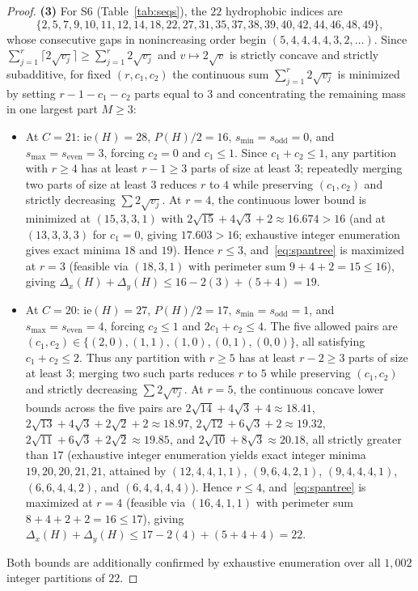 \documentclass[11pt]{article}
\begin{document}
\begin{proof}
\textbf{(3)} For S6 (Table~\ref{tab:seqs}), the $22$ hydrophobic indices are
\[
  \{2, 5, 7, 9, 10, 11, 12, 14, 18, 22, 27, 31, 35, 37, 38, 39, 40, 42, 44, 46, 48, 49\},
\]
whose consecutive gaps in nonincreasing order begin $(5, 4, 4, 4, 4, 3, 2, \dots)$. Since $\sum_{j=1}^r \lceil 2\sqrt{v_j}\rceil \ge \sum_{j=1}^r 2\sqrt{v_j}$ and $v \mapsto 2\sqrt{v}$ is strictly concave and strictly subadditive, for fixed $(r, c_1, c_2)$ the continuous sum $\sum_{j=1}^r 2\sqrt{v_j}$ is minimized by setting $r - 1 - c_1 - c_2$ parts equal to $3$ and concentrating the remaining mass in one largest part $M \ge 3$:
\begin{itemize}[leftmargin=*,topsep=1pt,itemsep=1pt]
\item At $C = 21$: $\mathrm{ie}(H) = 28$, $P(H)/2 = 16$, $s_{\min} = s_{\mathrm{odd}} = 0$, and $s_{\max} = s_{\mathrm{even}} = 3$, forcing $c_2 = 0$ and $c_1 \le 1$. Since $c_1 + c_2 \le 1$, any partition with $r \ge 4$ has at least $r - 1 \ge 3$ parts of size at least $3$; repeatedly merging two parts of size at least $3$ reduces $r$ to $4$ while preserving $(c_1, c_2)$ and strictly decreasing $\sum 2\sqrt{v_j}$. At $r = 4$, the continuous lower bound is minimized at $(15, 3, 3, 1)$ with $2\sqrt{15} + 4\sqrt{3} + 2 \approx 16.674 > 16$ (and at $(13, 3, 3, 3)$ for $c_1 = 0$, giving $17.603 > 16$; exhaustive integer enumeration gives exact minima $18$ and $19$). Hence $r \le 3$, and~\eqref{eq:spantree} is maximized at $r = 3$ (feasible via $(18, 3, 1)$ with perimeter sum $9 + 4 + 2 = 15 \le 16$), giving $\Delta_x(H) + \Delta_y(H) \le 16 - 2(3) + (5 + 4) = 19$.
\item At $C = 20$: $\mathrm{ie}(H) = 27$, $P(H)/2 = 17$, $s_{\min} = s_{\mathrm{odd}} = 1$, and $s_{\max} = s_{\mathrm{even}} = 4$, forcing $c_2 \le 1$ and $2c_1 + c_2 \le 4$. The five allowed pairs are $(c_1, c_2) \in \{(2, 0), (1, 1), (1, 0), (0, 1), (0, 0)\}$, all satisfying $c_1 + c_2 \le 2$. Thus any partition with $r \ge 5$ has at least $r - 2 \ge 3$ parts of size at least $3$; merging two such parts reduces $r$ to $5$ while preserving $(c_1, c_2)$ and strictly decreasing $\sum 2\sqrt{v_j}$. At $r = 5$, the continuous concave lower bounds across the five pairs are $2\sqrt{14} + 4\sqrt{3} + 4 \approx 18.41$, $2\sqrt{13} + 4\sqrt{3} + 2\sqrt{2} + 2 \approx 18.97$, $2\sqrt{12} + 6\sqrt{3} + 2 \approx 19.32$, $2\sqrt{11} + 6\sqrt{3} + 2\sqrt{2} \approx 19.85$, and $2\sqrt{10} + 8\sqrt{3} \approx 20.18$, all strictly greater than $17$ (exhaustive integer enumeration yields exact integer minima $19, 20, 20, 21, 21$, attained by $(12, 4, 4, 1, 1)$, $(9, 6, 4, 2, 1)$, $(9, 4, 4, 4, 1)$, $(6, 6, 4, 4, 2)$, and $(6, 4, 4, 4, 4)$). Hence $r \le 4$, and~\eqref{eq:spantree} is maximized at $r = 4$ (feasible via $(16, 4, 1, 1)$ with perimeter sum $8 + 4 + 2 + 2 = 16 \le 17$), giving $\Delta_x(H) + \Delta_y(H) \le 17 - 2(4) + (5 + 4 + 4) = 22$.
\end{itemize}
Both bounds are additionally confirmed by exhaustive enumeration over all $1{,}002$ integer partitions of $22$.
\end{proof}
\end{document}
